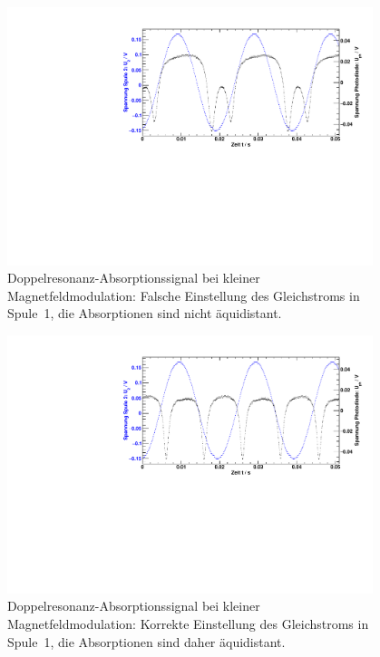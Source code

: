 \begin{figure}[H]
\begin{center}
  \includegraphics[width=0.95\textwidth]{../img/part3/11.pdf}
  \caption{Doppelresonanz-Absorptionssignal bei kleiner Magnetfeldmodulation:
  Falsche Einstellung des Gleichstroms in Spule~1,
  die Absorptionen sind nicht äquidistant.}
  \label{img:rfwrong}
\end{center}
\end{figure}

\begin{figure}[H]
\begin{center}
  \includegraphics[width=0.95\textwidth]{../img/part3/08.pdf}
  \caption{Doppelresonanz-Absorptionssignal bei kleiner Magnetfeldmodulation:
  Korrekte Einstellung des Gleichstroms in Spule~1,
  die Absorptionen sind daher äquidistant.}
  \label{img:rfcorrect}
\end{center}
\end{figure}

